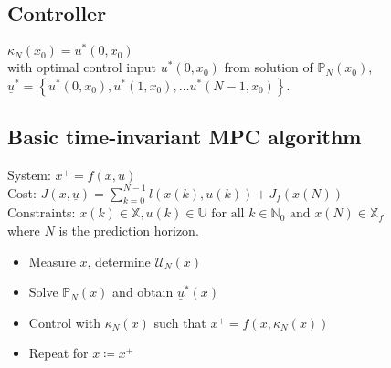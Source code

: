 \documentclass[english]{latex4ei/latex4ei_sheet}
\begin{document}
\begin{sectionbox}
\subsection{Controller}
$\kappa_{N}\left(x_{0}\right)=u^{*}\left(0, x_{0}\right)$ \\ 
with optimal control input $u^{*}\left(0, x_{0}\right)$ from solution of $\mathbb{P}_{N}\left(x_{0}\right)$, \\$\underline{u}^{*}=\left\{u^{*}\left(0, x_{0}\right), u^{*}\left(1, x_{0}\right), \ldots u^{*}\left(N-1, x_{0}\right)\right\}$.\\

\subsection{Basic time-invariant MPC algorithm}
System: $x^{+}=f(x, u)$\\ 
Cost: $J(x, \underline{u})=\sum\limits_{k=0}^{N-1} l(x(k), u(k))+J_{f}(x(N))$ \\
Constraints: $x(k) \in \mathbb{X}, u(k) \in \mathbb{U} \text { for all } k \in \mathbb{N}_{0} \text { and } x(N) \in \mathbb{X}_{f}$ \\
where $N$ is the prediction horizon.
\begin{itemize}
    \item Measure $x$, determine $\mathcal{U}_N(x)$
    \item Solve $\mathbb{P}_N(x)$ and obtain $\underline{u}^*(x)$
    \item Control with $\kappa_N(x)$ such that $x^+=f(x,\kappa_N(x))$
    \item Repeat for $x\coloneqq x^+$
\end{itemize}\vspace{0.2cm}


\end{sectionbox}
\end{document}
